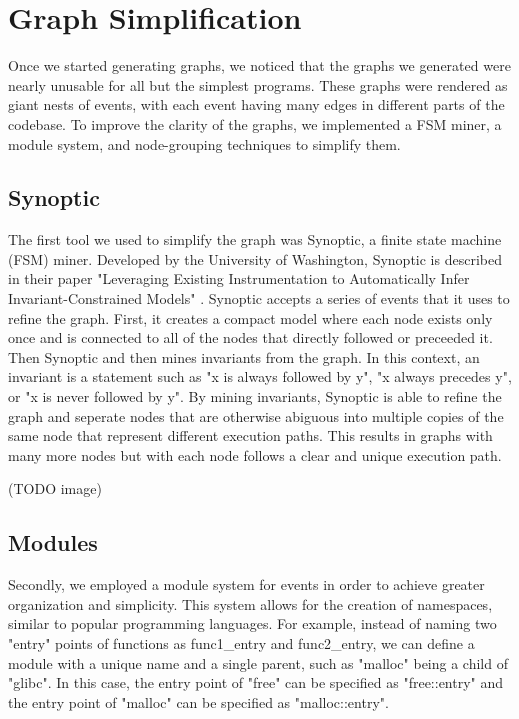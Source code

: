 \chapter{Graph Simplification}
Once we started generating graphs, we noticed that the graphs we generated were nearly unusable for all but the simplest programs. These graphs were rendered as giant nests of events, with each event having many edges in different parts of the codebase. To improve the clarity of the graphs, we implemented a FSM miner, a module system, and node-grouping techniques to simplify them.

\section{Synoptic}
The first tool we used to simplify the graph was Synoptic, a finite state machine (FSM) miner. Developed by the University of Washington, Synoptic is described in their paper "Leveraging Existing Instrumentation to Automatically Infer Invariant-Constrained Models" \cite{synoptic}. Synoptic accepts a series of events that it uses to refine the graph. First, it creates a compact model where each node exists only once and is connected to all of the nodes that directly followed or preceeded it. Then Synoptic and then mines invariants from the graph. In this context, an invariant is a statement such as "x is always followed by y", "x always precedes y", or "x is never followed by y". By mining invariants, Synoptic is able to refine the graph and seperate nodes that are otherwise abiguous into multiple copies of the same node that represent different execution paths. This results in graphs with many more nodes but with each node follows a clear and unique execution path.

(TODO image)

\section{Modules}
Secondly, we employed a module system for events in order to achieve greater organization and simplicity. This system allows for the creation of namespaces, similar to popular programming languages. For example, instead of naming two "entry" points of functions as func1\_entry and func2\_entry, we can define a module with a unique name and a single parent, such as "malloc" being a child of "glibc". In this case, the entry point of "free" can be specified as "free::entry" and the entry point of "malloc" can be specified as "malloc::entry".


